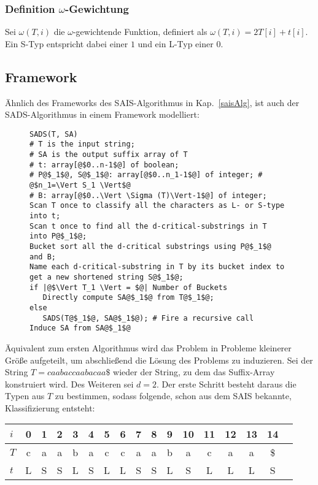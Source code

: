 \subsubsection{Definition $\omega$-Gewichtung}
\label{weighting}
Sei $\omega(T,i)$ die $\omega$-gewichtende Funktion, definiert als $\omega(T,i) = 2T[i]+t[i]$. Ein S-Typ entspricht dabei einer $1$ und ein L-Typ einer $0$.
\newpage
\subsection{Framework}
Ähnlich des Frameworks des SAIS-Algorithmus in Kap.~\ref{saisAlg}, ist auch der SADS-Algorithmus in einem Framework\cite[fig.~3]{saca:6} modelliert:
\label{sadsAlg}
\begin{figure}
\begin{verbatim}
SADS(T, SA)
# T is the input string;
# SA is the output suffix array of T
# t: array[@$0..n-1$@] of boolean;
# P@$_1$@, S@$_1$@: array[@$0..n_1-1$@] of integer; # @$n_1=\Vert S_1 \Vert$@
# B: array[@$0..\Vert \Sigma (T)\Vert-1$@] of integer;
Scan T once to classify all the characters as L- or S-type
into t;
Scan t once to find all the d-critical-substrings in T
into P@$_1$@;
Bucket sort all the d-critical substrings using P@$_1$@
and B;
Name each d-critical-substring in T by its bucket index to
get a new shortened string S@$_1$@;
if |@$\Vert T_1 \Vert = $@| Number of Buckets
   Directly compute SA@$_1$@ from T@$_1$@;
else
   SADS(T@$_1$@, SA@$_1$@); # Fire a recursive call
Induce SA from SA@$_1$@
\end{verbatim}
\end{figure}


\noindent Äquivalent zum ersten Algorithmus wird das Problem in Probleme kleinerer Größe aufgeteilt, um abschließend die Lösung des Problems zu induzieren.
Sei der String $T = caabaccaabacaa\$$ wieder der String, zu dem das Suffix-Array konstruiert wird. Des Weiteren sei $d = 2$. Der erste Schritt besteht daraus die Typen aus $T$
zu bestimmen, sodass folgende, schon aus dem SAIS bekannte, Klassifizierung entsteht:

\begin{center}
  \begin{tabular}{ | l | c | c | c | c | c | c | c | c | c | c | c | c | c | c | c | c | }
    \hline
        $i$ & 0 & 1 & 2 & 3 & 4 & 5 & 6 & 7 & 8 & 9 & 10 & 11 & 12 & 13 & 14 \\ \hline
        $T$ & c & a & a & b & a & c & c & a & a & b & a & c & a & a & \$ \\ \hline
        $t$ & L & S & S & L & S & L & L & S & S & L & S & L & L & L & S \\
    \hline
  \end{tabular}
\end{center}
\bigskip

